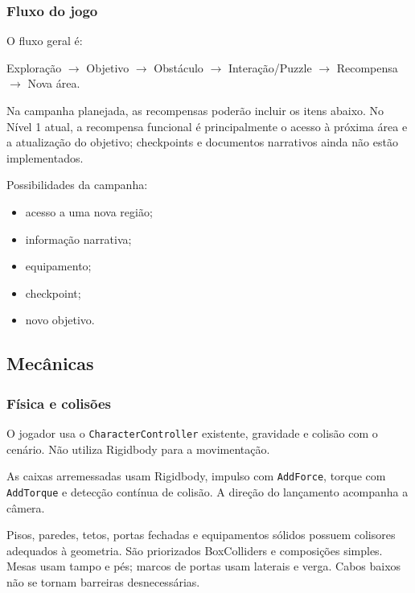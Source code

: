 \documentclass[12pt,a4paper]{article}
\begin{document}
\subsubsection{Fluxo do jogo}

O fluxo geral é:

\begin{center}
Exploração
$\rightarrow$
Objetivo
$\rightarrow$
Obstáculo
$\rightarrow$
Interação/Puzzle
$\rightarrow$
Recompensa
$\rightarrow$
Nova área.
\end{center}

Na campanha planejada, as recompensas poderão incluir os itens abaixo.
No Nível 1 atual, a recompensa funcional é principalmente o acesso
à próxima área e a atualização do objetivo; checkpoints e documentos
narrativos ainda não estão implementados.

Possibilidades da campanha:

\begin{itemize}
    \item acesso a uma nova região;
    \item informação narrativa;
    \item equipamento;
    \item checkpoint;
    \item novo objetivo.
\end{itemize}


\subsection{Mecânicas}

\subsubsection{Física e colisões}

O jogador usa o \texttt{CharacterController} existente, gravidade e
colisão com o cenário. Não utiliza Rigidbody para a movimentação.

As caixas arremessadas usam Rigidbody, impulso com \texttt{AddForce},
torque com \texttt{AddTorque} e detecção contínua de colisão. A direção
do lançamento acompanha a câmera.

Pisos, paredes, tetos, portas fechadas e equipamentos sólidos possuem
colisores adequados à geometria. São priorizados BoxColliders e
composições simples. Mesas usam tampo e pés; marcos de portas usam
laterais e verga. Cabos baixos não se tornam barreiras desnecessárias.
\end{document}

